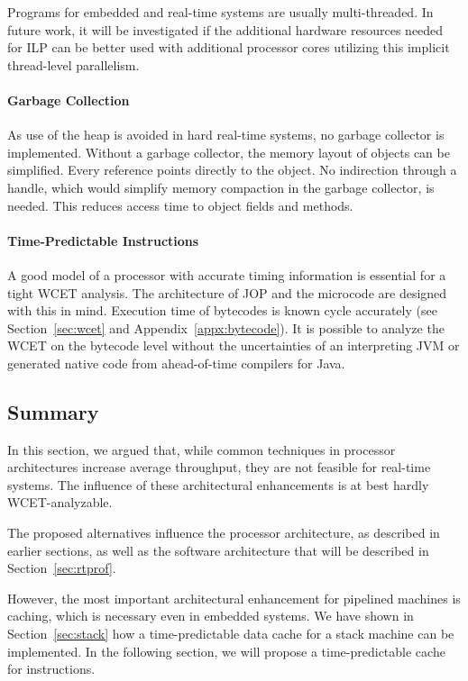 Programs for embedded and real-time systems are usually
multi-threaded. In future work, it will be investigated if the
additional hardware resources needed for ILP can be better used with
additional processor cores utilizing this implicit thread-level
parallelism.

\paragraph{Garbage Collection}

As use of the heap is avoided in hard real-time systems, no garbage
collector is implemented. Without a garbage collector, the memory
layout of objects can be simplified. Every reference points directly
to the object. No indirection through a handle, which would simplify
memory compaction in the garbage collector, is needed. This reduces
access time to object fields and methods.

\paragraph{Time-Predictable Instructions}

A good model of a processor with accurate timing information is
essential for a tight WCET analysis. The architecture of JOP and the
microcode are designed with this in mind. Execution time of
bytecodes is known cycle accurately (see Section~\ref{sec:wcet} and
Appendix~\ref{appx:bytecode}). It is possible to analyze the WCET on
the bytecode level \cite{R:Bernat:2000a} without the uncertainties
of an interpreting JVM \cite{R:Bate:2000a} or generated native code
from ahead-of-time compilers for Java.

\subsection{Summary}

In this section, we argued that, while common techniques in
processor architectures increase average throughput, they are not
feasible for real-time systems. The influence of these architectural
enhancements is at best hardly WCET-analyzable.

The proposed alternatives influence the processor architecture, as
described in earlier sections, as well as the software architecture
that will be described in Section~\ref{sec:rtprof}.

However, the most important architectural enhancement for pipelined
machines is caching, which is necessary even in embedded systems. We
have shown in Section~\ref{sec:stack} how a time-predictable data
cache for a stack machine can be implemented. In the following
section, we will propose a time-predictable cache for instructions.
